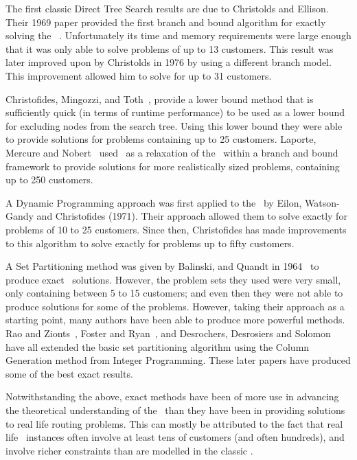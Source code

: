 The first classic Direct Tree Search results are due to Christolds and Ellison. Their 1969 paper provided the first branch and bound algorithm for exactly solving the \VRP~\cite{CE:1969}. Unfortunately its time and memory requirements were large enough that it was only able to solve problems of up to 13 customers. This result was later improved upon by Christolds in 1976 by using a different branch model. This improvement allowed him to solve for up to 31 customers. 

Christofides, Mingozzi, and Toth~\cite{CMT:1981}, provide a lower bound method that is sufficiently quick (in terms of runtime performance) to be used as a lower bound for excluding nodes from the search tree. Using this lower bound they were able to provide solutions for problems containing up to 25 customers. Laporte, Mercure and Nobert~\cite{LMN:1986} used \MTSP\ as a relaxation of the \VRP\ within a branch and bound framework to provide solutions for more realistically sized problems, containing up to 250 customers.  

A Dynamic Programming approach was first applied to the \VRP\ by Eilon, Watson-Gandy and Christofides (1971). Their approach allowed them to solve exactly for problems of 10 to 25 customers. Since then, Christofides has made improvements to this algorithm to solve exactly for problems up to fifty customers.

A Set Partitioning method was given by Balinski, and Quandt in 1964~\cite{balinski:64} to produce exact \VRP\ solutions. However, the problem sets they used were very small, only containing between 5 to 15 customers; and even then they were not able to produce solutions for some of the problems. However, taking their approach as a starting point, many authors have been able to produce more powerful methods. Rao and Zionts~\cite{RZ:1968}, Foster and Ryan~\cite{FR:1976}, and Desrochers, Desrosiers and Solomon~\cite{DMDJSM:1992} have all extended the basic set partitioning algorithm using the Column Generation method from Integer Programming. These later papers have produced some of the best exact results. 

Notwithstanding the above, exact methods have been of more use in advancing the theoretical understanding of the \VRP\ than they have been in providing solutions to real life routing problems. This can mostly be attributed to the fact that real life \VRP\ instances often involve at least tens of customers (and often hundreds), and involve richer constraints than are modelled in the classic \VRP.

